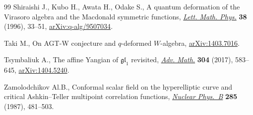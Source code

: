\documentclass[pdftex]{sigma}
\numberwithin{equation}{section}
\theoremstyle{definition}
\begin{document}
\begin{thebibliography}{99}
Shiraishi J., Kubo H., Awata H., Odake S., A quantum deformation of the
 {V}irasoro algebra and the {M}acdonald symmetric functions, \href{https://doi.org/10.1007/BF00398297}{\textit{Lett.
 Math. Phys.}} \textbf{38} (1996), 33--51, \href{https://arxiv.org/abs/q-alg/9507034}{arXiv:q-alg/9507034}.

Taki M., On {AGT}-{W} conjecture and $q$-deformed ${W}$-algebra,
 \href{https://arxiv.org/abs/1403.7016}{arXiv:1403.7016}.

Tsymbaliuk A., The affine {Y}angian of {$\mathfrak{gl}_1$} revisited,
 \href{https://doi.org/10.1016/j.aim.2016.08.041}{\textit{Adv. Math.}} \textbf{304} (2017), 583--645, \href{https://arxiv.org/abs/1404.5240}{arXiv:1404.5240}.

Zamolodchikov Al.B., Conformal scalar field on the hyperelliptic curve and
 critical {A}shkin--{T}eller multipoint correlation functions, \href{https://doi.org/10.1016/0550-3213(87)90350-6}{\textit{Nuclear
 Phys.~B}} \textbf{285} (1987), 481--503.

\end{thebibliography}\LastPageEnding
\end{document}
